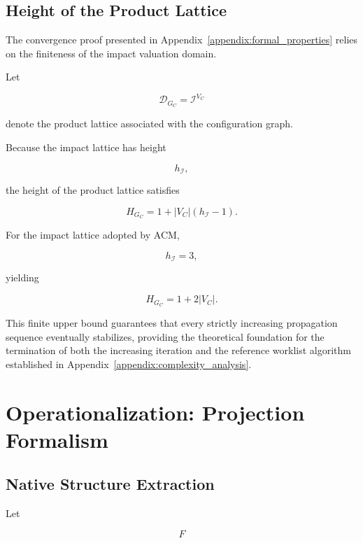 \documentclass[10pt]{article}
\begin{document}
\subsection{Height of the Product Lattice}
\label{appendix:lattice_height}

The convergence proof presented in Appendix~\ref{appendix:formal_properties}
relies on the finiteness of the impact valuation domain.

Let

\[
\mathcal D_{G_C}
=
\mathcal I^{V_C}
\]

denote the product lattice associated with the configuration graph.

Because the impact lattice has height

\[
h_{\mathcal I},
\]

the height of the product lattice satisfies

\begin{equation}
	\label{eq:product_lattice_height}
	H_{G_C}
	=
	1
	+
	|V_C|
	\left(
	h_{\mathcal I}-1
	\right).
\end{equation}

For the impact lattice adopted by ACM,

\[
h_{\mathcal I}=3,
\]

yielding

\begin{equation}
H_{G_C}
=
1+2|V_C|.
\label{eq:h_equality}
\end{equation}

This finite upper bound guarantees that every strictly increasing propagation sequence eventually stabilizes, providing the theoretical foundation for the termination of both the increasing iteration and the reference worklist algorithm established in Appendix~\ref{appendix:complexity_analysis}.

\section{Operationalization: Projection Formalism}
\label{appendix:projection_formalism}
\subsection{Native Structure Extraction}

Let

\[
F
\]
\end{document}
